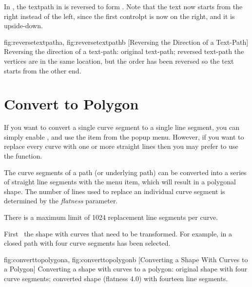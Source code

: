 In , the \gls*{textpath} in
 is reversed to form 
. Note that the text now starts
from the right instead of the left, since the first \gls*{controlpt}
is now on the right, and it is upside-down.

{
  {fig:reversetextpatha}{}{},
  {fig:reversetextpathb}{}{}
}
[Reversing the Direction of a Text-Path]
{Reversing the direction of a text-path:
 original text-path;
 reversed text-path\dash 
the vertices are in the same location, but the order has been
reversed so the text starts from the other end.}

\section{Convert to Polygon}\label{sec:converttopolygon}

If you want to convert a single \gls{curve} segment to a single
line segment, you can simply enable \editpathmode, and use the 
 item from the popup menu.
However, if you want to replace every curve with one or more straight
lines then you may prefer to use the 
function.


The \gls{curve} segments of a \gls{path} (or underlying path)
can be converted into a series of straight line segments with the
 menu item, which will result in
a polygonal shape. The number of lines used to replace an individual
curve segment is determined by the \emph{flatness} parameter.

\begin{information}
There is a maximum limit of 1024 replacement line segments per
\gls{curve}.
\end{information}

First \select\ the \gls{shape} with \glspl{curve} that need to be transformed.
For example, in  a closed \gls{path}
with four \gls{curve} segments has been selected.

{
  {fig:converttopolygona}{}{},
  {fig:converttopolygonb}{}{}
}
[Converting a Shape With Curves to a Polygon]
{Converting a shape with curves to a polygon:
 original shape with four
curve segments;
 converted shape (flatness 4.0) 
with fourteen line segments.}



